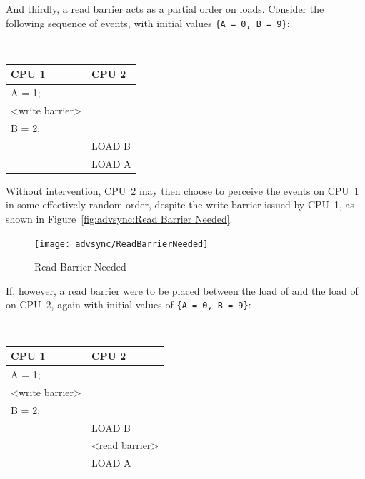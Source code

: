 And thirdly, a read barrier acts as a partial order on loads.  Consider the
following sequence of events, with initial values
{\tt \{A = 0, B = 9\}}:

\vspace{5pt}
\begin{minipage}[t]{\columnwidth}
\tt
\scriptsize
\begin{tabular}{l|p{1.5in}}
	CPU 1 &		CPU 2 \\
	\hline
	A = 1; & \\
	<write barrier> & \\
	B = 2; & \\
		&	LOAD B \\
		&	LOAD A \\
\end{tabular}
\end{minipage}
\vspace{5pt}

Without intervention, CPU~2 may then choose to perceive the events on CPU~1 in
some effectively random order, despite the write barrier issued by CPU~1, as
shown in Figure~\ref{fig:advsync:Read Barrier Needed}.

\begin{figure}[htb]
\begin{center}
\texttt{[image: advsync/ReadBarrierNeeded]}
\end{center}
\caption{Read Barrier Needed}
\end{figure}

If, however, a read barrier were to be placed between the load of 
and the load of  on CPU~2, again with initial values of
{\tt \{A = 0, B = 9\}}:

\vspace{5pt}
\begin{minipage}[t]{\columnwidth}
\tt
\scriptsize
\begin{tabular}{l|p{1.5in}}
	CPU 1 &		CPU 2 \\
	\hline
	A = 1; & \\
	<write barrier> & \\
	B = 2; & \\
		&	LOAD B \\
		&	<read barrier> \\
		&	LOAD A \\
\end{tabular}
\end{minipage}
\vspace{5pt}

